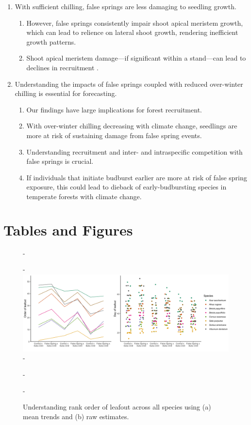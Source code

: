\documentclass{article}\usepackage[]{graphicx}\usepackage[]{color}
\begin{document}
\begin{enumerate}
\item With sufficient chilling, false springs are less damaging to seedling growth.
  \begin{enumerate}
  \item However, false springs consistently impair shoot apical meristem growth, which can lead to relience on lateral shoot growth, rendering inefficient growth patterns.
  \item Shoot apical meristem damage---if significant within a stand---can lead to declines in recruitment \citep{Rhodes2018}. 
  \end{enumerate}
  
\item Understanding the impacts of false springs coupled with reduced over-winter chilling is essential for forecasting.
  \begin{enumerate}
  \item Our findings have large implications for forest recruitment.
  \item With over-winter chilling decreasing with climate change, seedlings are more at risk of sustaining damage from false spring events. 
  \item Understanding recruitment and inter- and intraspecific competition with false springs is crucial. 
  \item If individuals that initiate budburst earlier are more at risk of false spring exposure, this could lead to dieback of early-budbursting species in temperate forests with climate change.
  \end{enumerate}
\end{enumerate}






\section*{Tables and Figures}
  {\begin{figure} [H]
  -\begin{center}
  -\includegraphics[width=18cm]{..//analyses/figures/leafout_orderandraw.png} 
  -\caption{Understanding rank order of leafout across all species using (a) mean trends and (b) raw estimates. }\label{fig:rank}
  -\end{center}
  -\end{figure}}
  
\end{document}
